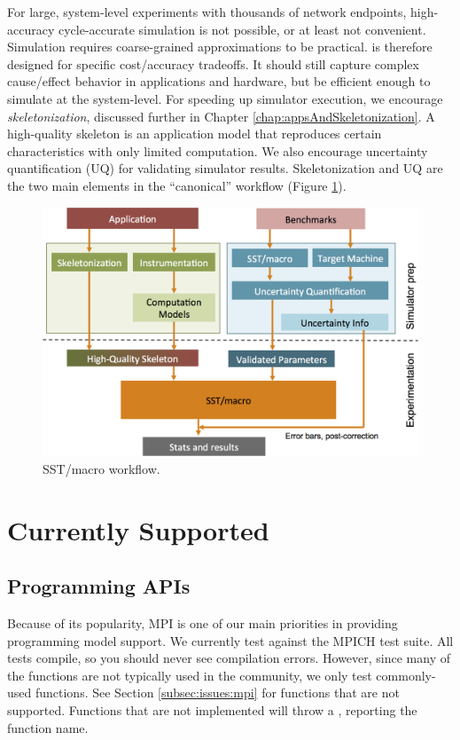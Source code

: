 For large, system-level experiments with thousands of network endpoints, high-accuracy cycle-accurate simulation is not possible,
or at least not convenient.
Simulation requires coarse-grained approximations to be practical.
\sstmacro is therefore designed for specific cost/accuracy tradeoffs.
It should still capture complex cause/effect behavior in applications and hardware, but be efficient enough to simulate at the system-level. 
For speeding up simulator execution, we encourage \textit{skeletonization}, discussed further in Chapter \ref{chap:appsAndSkeletonization}. 
A high-quality skeleton is an application model that reproduces certain characteristics with only limited computation.  
We also encourage uncertainty quantification (UQ) for validating simulator results.
Skeletonization and UQ are the two main elements in the ``canonical'' \sstmacro workflow (Figure \ref{fig:workflow}).

\begin{figure}[t]
  \centering
    \includegraphics[width=0.99\columnwidth]{figures/workflow.png}
      \caption{SST/macro workflow.}
      \label{fig:workflow}
\end{figure}

\section{Currently Supported}
\label{sec:intro:supported}

\subsection{Programming APIs}
\label{subsec:intro:apis}

Because of its popularity, MPI is one of our main priorities in providing programming model support.  
We currently test against the MPICH test suite. All tests compile, so you should never see compilation errors.  
However, since many of the functions are not typically used in the community, we only test commonly-used functions.   
See Section \ref{subsec:issues:mpi} for functions that are not supported.  
Functions that are not implemented will throw a , reporting the function name. 

